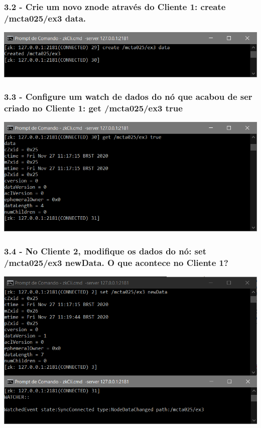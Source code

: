 \subsubsection{3.2 - Crie um novo znode através do Cliente 1: create /mcta025/ex3
data.}

\includegraphics{pratica3/prints/roteiro 3.2.PNG}

\subsubsection{3.3 - Configure um watch de dados do nó que acabou de ser criado no
Cliente 1: get /mcta025/ex3 true}

\includegraphics{pratica3/prints/roteiro 3.3.PNG}

\subsubsection{3.4 - No Cliente 2, modifique os dados do nó: set /mcta025/ex3
newData. O que acontece no Cliente 1?}

\includegraphics{pratica3/prints/roteiro 3.4.PNG}

